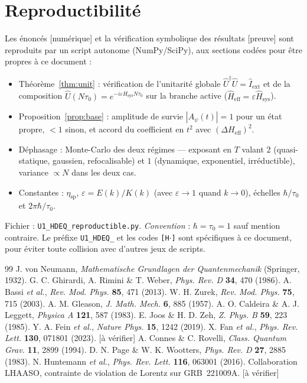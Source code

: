 \documentclass[11pt,a4paper]{article}
\newcommand{\Hsysop}{\hat{H}_{\mathrm{sys}}}
\newcommand{\Heff}{\hat{H}_{\mathrm{eff}}}
\newcommand{\Iext}{\hat{I}_{\mathrm{ext}}}
\newcommand{\statut}[1]{{\footnotesize\textsf{[#1]}}}
\theoremstyle{plain}
\theoremstyle{definition}
\theoremstyle{remark}
\begin{document}
\section*{Reproductibilit\'e}
Les \'enonc\'es \statut{num\'erique} et la v\'erification symbolique des r\'esultats
\statut{preuve} sont reproduits par un script autonome (NumPy/SciPy), aux sections
cod\'ees pour \^etre propres \`a ce document :
\begin{itemize}
\item[{\texttt{[H1]}}] Th\'eor\`eme~\ref{thm:unit} : v\'erification de l'unitarit\'e globale $\hat U^\dagger\hat U=\Iext$ et de la composition $\hat U(N\tau_0)=e^{-i\varepsilon\Hsysop N\tau_0}$ sur la branche active ($\Heff=\varepsilon\Hsysop$).
\item[{\texttt{[H2]}}] Proposition~\ref{prop:base} : amplitude de survie $|A_\psi(t)|=1$ pour un \'etat propre, $<1$ sinon, et accord du coefficient en $t^2$ avec $(\Delta H_{\mathrm{eff}})^2$.
\item[{\texttt{[H3]}}] D\'ephasage : Monte-Carlo des deux r\'egimes --- exposant en $T$ valant $2$ (quasi-statique, gaussien, refocalisable) et $1$ (dynamique, exponentiel, irr\'eductible), variance $\propto N$ dans les deux cas.
\item[{\texttt{[H4]}}] Constantes : $\eta_{\mathrm{sp}}$, $\varepsilon=E(k)/K(k)$ (avec $\varepsilon\to1$ quand $k\to0$), \'echelles $\hbar/\tau_0$ et $2\pi\hbar/\tau_0$.
\end{itemize}
Fichier : \texttt{U1\_HDEQ\_reproductible.py}. \emph{Convention} : $\hbar=\tau_0=1$ sauf
mention contraire. Le pr\'efixe \texttt{U1\_HDEQ\_} et les codes \texttt{[H$\cdot$]} sont
sp\'ecifiques \`a ce document, pour \'eviter toute collision avec d'autres jeux de scripts.

\begin{thebibliography}{99}
 J. von Neumann, \textit{Mathematische Grundlagen der Quantenmechanik} (Springer, 1932).
 G. C. Ghirardi, A. Rimini \& T. Weber, \textit{Phys. Rev. D} \textbf{34}, 470 (1986).
 A. Bassi \textit{et al.}, \textit{Rev. Mod. Phys.} \textbf{85}, 471 (2013).
 W. H. Zurek, \textit{Rev. Mod. Phys.} \textbf{75}, 715 (2003).
 A. M. Gleason, \textit{J. Math. Mech.} \textbf{6}, 885 (1957).
 A. O. Caldeira \& A. J. Leggett, \textit{Physica A} \textbf{121}, 587 (1983).
 E. Joos \& H. D. Zeh, \textit{Z. Phys. B} \textbf{59}, 223 (1985).
 Y. A. Fein \textit{et al.}, \textit{Nature Phys.} \textbf{15}, 1242 (2019).
 X. Fan \textit{et al.}, \textit{Phys. Rev. Lett.} \textbf{130}, 071801 (2023). \statut{\`a v\'erifier}
 A. Connes \& C. Rovelli, \textit{Class. Quantum Grav.} \textbf{11}, 2899 (1994).
 D. N. Page \& W. K. Wootters, \textit{Phys. Rev. D} \textbf{27}, 2885 (1983).
 N. Huntemann \textit{et al.}, \textit{Phys. Rev. Lett.} \textbf{116}, 063001 (2016).
 Collaboration LHAASO, contrainte de violation de Lorentz sur GRB~221009A. \statut{\`a v\'erifier}
\end{thebibliography}
\end{document}
